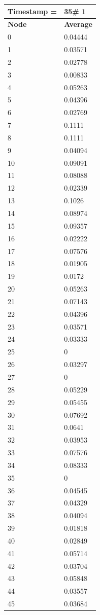 \begin{tabular}{|l||l|}
\hline
\textbf{Timestamp =} & \textbf{35}\# 1\\\hline
	\textbf{Node} & \textbf{Average} \\ \hline
\hline
	0 & 0.04444 \\ \hline
	1 & 0.03571 \\ \hline
	2 & 0.02778 \\ \hline
	3 & 0.00833 \\ \hline
	4 & 0.05263 \\ \hline
	5 & 0.04396 \\ \hline
	6 & 0.02769 \\ \hline
	7 & 0.1111 \\ \hline
	8 & 0.1111 \\ \hline
	9 & 0.04094 \\ \hline
	10 & 0.09091 \\ \hline
	11 & 0.08088 \\ \hline
	12 & 0.02339 \\ \hline
	13 & 0.1026 \\ \hline
	14 & 0.08974 \\ \hline
	15 & 0.09357 \\ \hline
	16 & 0.02222 \\ \hline
	17 & 0.07576 \\ \hline
	18 & 0.01905 \\ \hline
	19 & 0.0172 \\ \hline
	20 & 0.05263 \\ \hline
	21 & 0.07143 \\ \hline
	22 & 0.04396 \\ \hline
	23 & 0.03571 \\ \hline
	24 & 0.03333 \\ \hline
	25 & 0 \\ \hline
	26 & 0.03297 \\ \hline
	27 & 0 \\ \hline
	28 & 0.05229 \\ \hline
	29 & 0.05455 \\ \hline
	30 & 0.07692 \\ \hline
	31 & 0.0641 \\ \hline
	32 & 0.03953 \\ \hline
	33 & 0.07576 \\ \hline
	34 & 0.08333 \\ \hline
	35 & 0 \\ \hline
	36 & 0.04545 \\ \hline
	37 & 0.04329 \\ \hline
	38 & 0.04094 \\ \hline
	39 & 0.01818 \\ \hline
	40 & 0.02849 \\ \hline
	41 & 0.05714 \\ \hline
	42 & 0.03704 \\ \hline
	43 & 0.05848 \\ \hline
	44 & 0.03557 \\ \hline
	45 & 0.03684 \\ \hline
\end{tabular}
